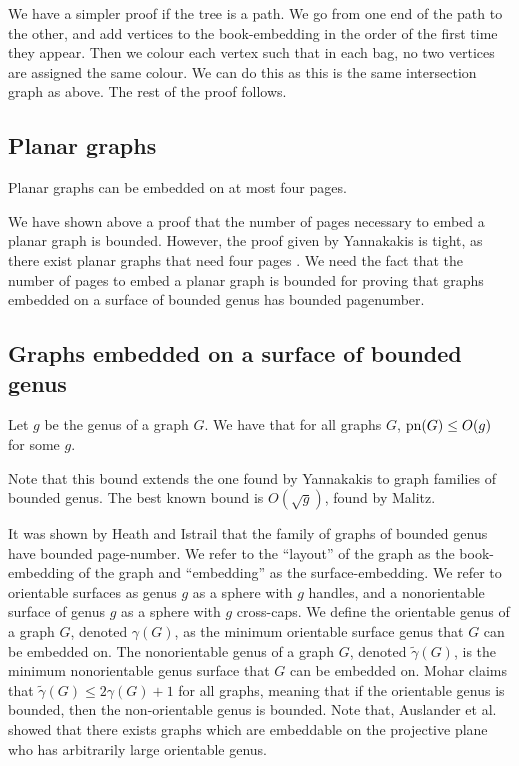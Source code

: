 We have a simpler proof if the tree is a path. We go from one end of the path to the other, and add vertices to the book-embedding in the order of the first time they appear. Then we colour each vertex such that in each bag, no two vertices are assigned the same colour. We can do this as this is the same intersection graph as above. The rest of the proof follows.

\subsection{Planar graphs}\label{ssec:Planar_Graphs}
\begin{theorem} \label{thm:4Pages_Planar}
	Planar graphs can be embedded on at most four pages.
\end{theorem}
We have shown above a proof that the number of pages necessary to embed a planar graph is bounded. However, the proof given by Yannakakis is tight, as there exist planar graphs that need four pages \cite{yannakakisPlanarGraphsThat2020} \cite{kaufmannFourPagesAre2020}. We need the fact that the number of pages to embed a planar graph is bounded for proving that graphs embedded on a surface of bounded genus has bounded pagenumber. 

\subsection{Graphs embedded on a surface of bounded genus}\label{ssec:pagenumber_bounded_genus}
\begin{theorem}\label{thm:Genus_pagenumber_bound}
	Let \(g\) be the genus of a graph \(G\). We have that for all graphs \(G\), \(\text{pn}(G) \leq O(g)\) for some \(g\).
\end{theorem}
Note that this bound extends the one found by Yannakakis \cite{yannakakisEmbeddingPlanarGraphs1989} to graph families of bounded genus. 
The best known bound is \(O(\sqrt{g})\), found by Malitz\cite{malitzGenusGraphsHave1994}.

It was shown by Heath and Istrail that the family of graphs of bounded genus have bounded page-number. 
We refer to the ``layout'' of the graph as the book-embedding of the graph and ``embedding'' as the surface-embedding. We refer to orientable surfaces as genus \(g\) as a sphere with \(g\) handles, and a nonorientable surface of genus \(g\) as a sphere with \(g\) cross-caps. We define the orientable genus of a graph \(G\), denoted \(\gamma(G)\), as the minimum orientable surface genus that \(G\) can be embedded on. The nonorientable genus of a graph \(G\), denoted \(\tilde{\gamma}(G)\), is the minimum nonorientable genus surface that \(G\) can be embedded on. Mohar\cite{moharOrientableGenusGraphs1998} claims that \(\tilde{\gamma}(G) \leq 2 \gamma(G) + 1\) for all graphs, meaning that if the orientable genus is bounded, then the non-orientable genus is bounded. Note that, Auslander et al.\cite{auslanderImbeddingGraphsManifolds1963} showed that there exists graphs which are embeddable on the projective plane who has arbitrarily large orientable genus. 
